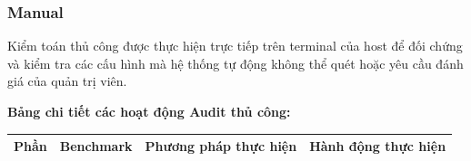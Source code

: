 \subsubsection{Manual}\label{trien-khai-audit-manual}

Kiểm toán thủ công được thực hiện trực tiếp trên terminal của host để đối chứng và kiểm tra các cấu hình mà hệ thống tự động không thể quét hoặc yêu cầu đánh giá của quản trị viên.

\textbf{Bảng chi tiết các hoạt động Audit thủ công:}

{\def\LTcaptype{none} %
\begin{longtable}[]{@{}|
  >{\raggedright\arraybackslash}p{}|
  >{\raggedright\arraybackslash}p{}|
  >{\raggedright\arraybackslash}p{}|
  >{\raggedright\arraybackslash}p{}|@{}}
\hline
\begin{minipage}[b]{\linewidth}\raggedright
\textbf{Phần}
\end{minipage} & \begin{minipage}[b]{\linewidth}\raggedright
\textbf{Benchmark}
\end{minipage} & \begin{minipage}[b]{\linewidth}\raggedright
\textbf{Phương pháp thực hiện}
\end{minipage} & \begin{minipage}[b]{\linewidth}\raggedright
\textbf{Hành động thực hiện}
\end{minipage} \\
\hline
\endhead


\end{longtable}}
